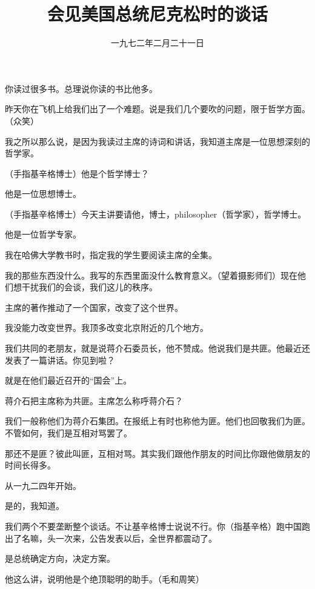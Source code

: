 
\title{会见美国总统尼克松时的谈话}
\date{一九七二年二月二十一日}
\maketitle


你读过很多书。总理说你读的书比他多。

昨天你在飞机上给我们出了一个难题。说是我们几个要吹的问题，限于哲学方面。（众笑）

我之所以那么说，是因为我读过主席的诗词和讲话，我知道主席是一位思想深刻的哲学家。

（手指基辛格博士）他是个哲学博士？

他是一位思想博士。

（手指基辛格博士）今天主讲要请他，博士，philosopher（哲学家），哲学博士。

他是一位哲学专家。

我在哈佛大学教书时，指定我的学生要阅读主席的全集。

我的那些东西没什么。我写的东西里面没什么教育意义。（望着摄影师们）现在他们想干扰我们的会谈，我们这儿的秩序。

主席的著作推动了一个国家，改变了这个世界。

我没能力改变世界。我顶多改变北京附近的几个地方。

我们共同的老朋友，就是说蒋介石委员长，他不赞成。他说我们是共匪。他最近还发表了一篇讲话。你见到啦？

就是在他们最近召开的“国会”上。

蒋介石把主席称为共匪。主席怎么称呼蒋介石？

我们一般称他们为蒋介石集团。在报纸上有时也称他为匪。他们也回敬我们为匪。不管如何，我们是互相对骂罢了。

那还不是匪？彼此叫匪，互相对骂。其实我们跟他作朋友的时间比你跟他做朋友的时间长得多。

从一九二四年开始。

是的，我知道。

我们两个不要垄断整个谈话。不让基辛格博士说说不行。你（指基辛格）跑中国跑出了名嘛，头一次来，公告发表以后，全世界都震动了。

是总统确定方向，决定方案。

他这么讲，说明他是个绝顶聪明的助手。（毛和周笑）

